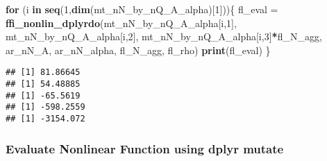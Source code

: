 \documentclass[
]{book}
\newenvironment{Shaded}{\begin{snugshade}}{\end{snugshade}}
\newcommand{\ControlFlowTok}[1]{\textcolor[rgb]{0.13,0.29,0.53}{\textbf{#1}}}
\newcommand{\DecValTok}[1]{\textcolor[rgb]{0.00,0.00,0.81}{#1}}
\newcommand{\KeywordTok}[1]{\textcolor[rgb]{0.13,0.29,0.53}{\textbf{#1}}}
\newcommand{\NormalTok}[1]{#1}
\newcommand{\OperatorTok}[1]{\textcolor[rgb]{0.81,0.36,0.00}{\textbf{#1}}}
\newcommand{\StringTok}[1]{\textcolor[rgb]{0.31,0.60,0.02}{#1}}
\begin{document}
\begin{Shaded}
\begin{Highlighting}[]
\ControlFlowTok{for}\NormalTok{ (i }\ControlFlowTok{in} \KeywordTok{seq}\NormalTok{(}\DecValTok{1}\NormalTok{,}\KeywordTok{dim}\NormalTok{(mt_nN_by_nQ_A_alpha)[}\DecValTok{1}\NormalTok{]))\{}
\NormalTok{  fl_eval =}\StringTok{ }\KeywordTok{ffi_nonlin_dplyrdo}\NormalTok{(mt_nN_by_nQ_A_alpha[i,}\DecValTok{1}\NormalTok{],}
\NormalTok{                               mt_nN_by_nQ_A_alpha[i,}\DecValTok{2}\NormalTok{],}
\NormalTok{                               mt_nN_by_nQ_A_alpha[i,}\DecValTok{3}\NormalTok{]}\OperatorTok{*}\NormalTok{fl_N_agg,}
\NormalTok{                               ar_nN_A, ar_nN_alpha, fl_N_agg, fl_rho)}
  \KeywordTok{print}\NormalTok{(fl_eval)}
\NormalTok{\}}
\end{Highlighting}
\end{Shaded}

\begin{verbatim}
## [1] 81.86645
## [1] 54.48885
## [1] -65.5619
## [1] -598.2559
## [1] -3154.072
\end{verbatim}

\hypertarget{evaluate-nonlinear-function-using-dplyr-mutate}{%
\subsubsection{Evaluate Nonlinear Function using dplyr mutate}\label{evaluate-nonlinear-function-using-dplyr-mutate}}
\end{document}
